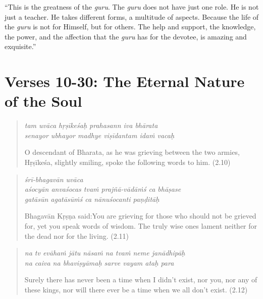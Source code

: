 \documentclass[12pt, twoside, openright]{memoir}
\begin{document}
\enquote{This is the greatness of the \textit{guru}. The \textit{guru} does not have just one role. He is not just a teacher. He takes different forms, a multitude of aspects. Because the life of the \textit{guru} is not for Himself, but for others. The help and support, the knowledge, the power, and the affection that the \textit{guru} has for the devotee, is amazing and exquisite.}

\newpage
\section{Verses 10-30: The Eternal Nature of the Soul}\label{sec-verses-10-30-the-eternal-nature-of-the-soul}


\par
\begin{verse}
\textit{tam uvāca hṛṣīkeśaḥ prahasann iva bhārata} \\
\textit{senayor ubhayor madhye viṣīdantam idaṁ vacaḥ}

\noindent O descendant of Bharata, as he was grieving between the two armies, Hṛṣīkeśa, slightly smiling, spoke the following words to him. (2.10)
\end{verse}
\par



\par
\begin{verse}
\textit{śrī-bhagavān uvāca} \\
\textit{aśocyān anvaśocas tvaṁ prajñā-vādāṁś ca bhāṣase} \\
\textit{gatāsūn agatāsūṁś ca nānuśocanti paṇḍitāḥ}

\noindent \quad Bhagavān Kṛṣṇa said:\linebreak You are grieving for those who should not be grieved for, yet you speak words of wisdom. The truly wise ones lament neither for the dead nor for the living. (2.11)
\end{verse}
\par



\par
\begin{verse}
\textit{na tv evāhaṁ jātu nāsaṁ na tvaṁ neme janādhipāḥ} \\
\textit{na caiva na bhaviṣyāmaḥ sarve vayam ataḥ para}

\noindent Surely there has never been a time when I didn't exist, nor you, nor any of these kings, nor will there ever be a time when we all don't exist. (2.12)
\end{verse}
\par
\end{document}
